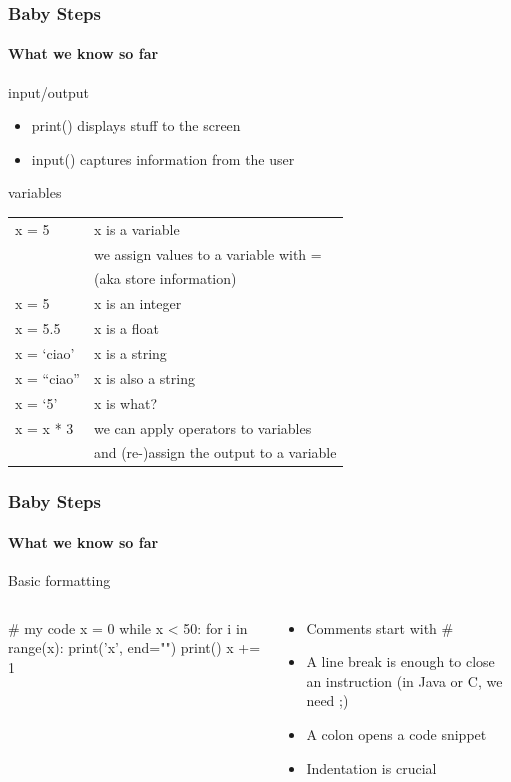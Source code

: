 \documentclass[xcolor=x11names,handout]{beamer}
\begin{document}
\begin{frame}
\frametitle{Baby Steps}
\framesubtitle{What we know so far}

\alert{input/output}

\begin{itemize}
\item print() displays stuff to the screen
\item input() captures information from the user
\end{itemize}										\pause 

\alert{variables}
\medskip

\centering
\begin{tabular}{ll}\hline
x = 5		& x is a variable	\\
			& we assign values to a variable with = 	\\
			& (aka store information)					\\\hline	\pause 

x = 5		& x is an integer	\\
x = 5.5		& x is a float	\\
x = ‘ciao’	& x is a string	\\
x = “ciao”	& x is also a string	\\
x = ‘5’		& x is \alert{what?}	\\\hline					\pause 
 
x  = x * 3	& we can apply operators to variables	\\
			& and (re-)assign the output to a variable	\\	\hline

\end{tabular}
\end{frame}

\begin{frame}[fragile]
\frametitle{Baby Steps}
\framesubtitle{What we know so far}

\alert{Basic formatting}

\begin{columns}
\begin{column}{0.4\textwidth}
\begin{python}
# my code
x = 0            
while x < 50:
	for i in range(x):  
		print('x', end="")
	print()
	x += 1
\end{python}
\end{column}

\begin{column}{0.55\textwidth}
\begin{itemize}
\item Comments start with \alert{\#}
\item A \alert{line break} is enough to close an instruction (in Java or C, we 
need \alert{;})
\item A \alert{colon} opens a code snippet
\item \alert{Indentation is crucial}
\end{itemize}
\end{column}
\end{columns}
\end{frame}
\end{document}
